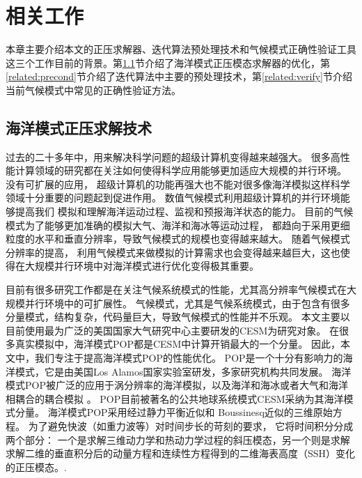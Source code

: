 \chapter{相关工作}
\label{cha:related}
本章主要介绍本文的正压求解器、迭代算法预处理技术和气候模式正确性验证工具这三个工作目前的背景。第\ref{solver:Backgroud}节介绍了海洋模式正压模态求解器的优化，第\ref{related:precond}节介绍了迭代算法中主要的预处理技术，第\ref{related:verify}节介绍当前气候模式中常见的正确性验证方法。


\section{海洋模式正压求解技术}
\label{solver:Backgroud} 

过去的二十多年中，用来解决科学问题的超级计算机变得越来越强大。 
很多高性能计算领域的研究都在关注如何使得科学应用能够更加适应大规模的并行环境。 
没有可扩展的应用， 超级计算机的功能再强大也不能对很多像海洋模拟这样科学领域十分重要的问题起到促进作用。 
数值气候模式利用超级计算机的并行环境能够提高我们 模拟和理解海洋运动过程、监视和预报海洋状态的能力。 
目前的气候模式为了能够更加准确的模拟大气、海洋和海冰等运动过程， 都趋向于采用更细粒度的水平和垂直分辨率，导致气候模式的规模也变得越来越大。 
随着气候模式分辨率的提高， 利用气候模式来做模拟的计算需求也会变得越来越巨大，这也使得在大规模并行环境中对海洋模式进行优化变得极其重要。 



目前有很多研究工作都是在关注气候系统模式的性能，尤其高分辨率气候模式在大规模并行环境中的可扩展性。 
气候模式，尤其是气候系统模式，由于包含有很多分量模式，结构复杂，代码量巨大，导致气候模式的性能并不乐观。 
本文主要以目前使用最为广泛的美国国家大气研究中心主要研发的CESM为研究对象。
在很多真实模拟中，海洋模式POP都是CESM中计算开销最大的一个分量\cite{Worley:2011:PCE:2063384.2063457, dennis2012computational}。 
因此，本文中，我们专注于提高海洋模式POP的性能优化。 
POP是一个十分有影响力的海洋模式，它是由美国Los Alamos国家实验室研发，多家研究机构共同发展。
海洋模式POP被广泛的应用于涡分辨率的海洋模拟\cite{mcclean2002eulerian, stark2004towards}，以及海洋和海冰或者大气和海洋相耦合的耦合模拟  \cite{May2002preliminary}。 
POP目前被著名的公共地球系统模式CESM采纳为其海洋模式分量。  
海洋模式POP采用经过静力平衡近似和  Boussinesq近似的三维原始方程。 
为了避免快波（如重力波等）对时间步长的苛刻的要求， 它将时间积分分成两个部分： 一个是求解三维动力学和热动力学过程的斜压模态，另一个则是求解求解二维的垂直积分后的动量方程和连续性方程得到的二维海表高度（SSH）变化的正压模态。\cite{smith2010parallel}.

